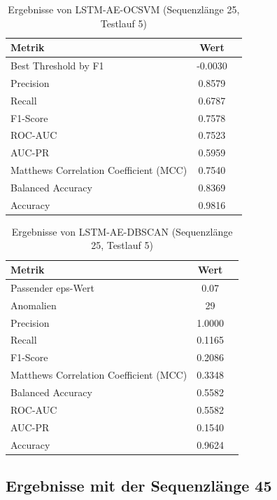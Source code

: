 \documentclass[a4paper,12pt]{article}
\begin{document}
\begin{table}[H]
	\centering
	\caption{Ergebnisse von LSTM-AE-OCSVM (Sequenzlänge 25, Testlauf 5)}
	\begin{tabular}{lcc}
		\hline
		Metrik & Wert \\
		\hline
		Best Threshold by F1 & -0.0030 \\
		Precision & 0.8579 \\
		Recall & 0.6787 \\
		F1-Score & 0.7578 \\
		ROC-AUC & 0.7523 \\
		AUC-PR & 0.5959 \\
		Matthews Correlation Coefficient (MCC) & 0.7540 \\
		Balanced Accuracy & 0.8369 \\
		Accuracy & 0.9816 \\
		\hline
	\end{tabular}
\end{table}

\begin{table}[H]
	\centering
	\caption{Ergebnisse von LSTM-AE-DBSCAN (Sequenzlänge 25, Testlauf 5)}
	\begin{tabular}{lcc}
		\hline
		Metrik & Wert \\
		\hline
		Passender eps-Wert & 0.07 \\
		Anomalien & 29 \\
		Precision & 1.0000 \\
		Recall & 0.1165 \\
		F1-Score & 0.2086 \\
		Matthews Correlation Coefficient (MCC) & 0.3348 \\
		Balanced Accuracy & 0.5582 \\
		ROC-AUC & 0.5582 \\
		AUC-PR & 0.1540 \\
		Accuracy & 0.9624 \\
		\hline
	\end{tabular}
\end{table}
\newpage
\subsection*{Ergebnisse mit der Sequenzlänge 45}
\end{document}
